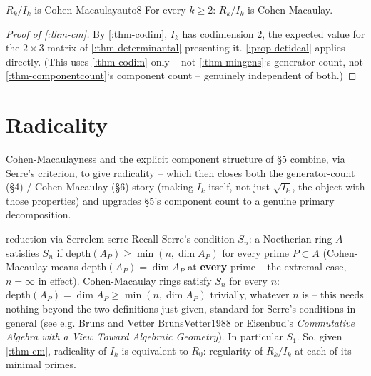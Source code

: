 \documentclass[a4paper,11pt]{scrartcl}
\begin{document}
\begin{theorem}{{}\(R_{k}/I_{k}\) is Cohen-Macaulay}{auto8} For every \(k \geq 2\): \(R_{k}/I_{k}\) is Cohen-Macaulay.

\end{theorem} \protect{}\label{thm-cm}{}

\begin{proof}[Proof of \cref{:thm-cm}] By \cref{:thm-codim}, \(I_{k}\) has codimension 2, the expected value for the \(2 \times 3\) matrix of \cref{:thm-determinantal} presenting it. \cref{:prop-detideal} applies directly. (This uses \cref{:thm-codim} only -- not \cref{:thm-mingens}`s generator count, not \cref{:thm-componentcount}`s component count -- genuinely independent of both.)

\end{proof}

\section{Radicality}

Cohen-Macaulayness and the explicit component structure of §5 combine, via Serre's criterion, to give radicality -- which then closes both the generator-count (§4) / Cohen-Macaulay (§6) story (making \(I_{k}\) itself, not just \(\sqrt{I_{k}}\), the object with those properties) and upgrades §5's component count to a genuine primary decomposition.

\begin{lemma}{reduction via Serre}{lem-serre} Recall Serre's condition \(S_{n}\): a Noetherian ring \(A\) satisfies \(S_{n}\) if \(\text{depth}\left( A_{P} \right) \geq \min(n,\dim A_{P})\) for every prime \(P \subset A\) (Cohen-Macaulay means \(\text{depth}\left( A_{P} \right) = \dim A_{P}\) at \textbf{every} prime -- the extremal case, \(n = \infty\) in effect). Cohen-Macaulay rings satisfy \(S_{n}\) for every \(n\): \(\text{depth}\left( A_{P} \right) = \dim A_{P} \geq \min(n,\dim A_{P})\) trivially, whatever \(n\) is -- this needs nothing beyond the two definitions just given, standard for Serre's conditions in general (see e.g. Bruns and Vetter BrunsVetter1988 or Eisenbud's \emph{Commutative Algebra with a View Toward Algebraic Geometry}). In particular \(S_{1}\). So, given \cref{:thm-cm}, radicality of \(I_{k}\) is equivalent to \(R_{0}\): regularity of \(R_{k}/I_{k}\) at each of its minimal primes.

\end{lemma} \protect{}\label{lem-serre}{}
\end{document}
